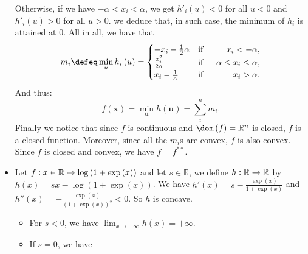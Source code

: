 \documentclass{article}
\begin{document}
\begin{itemize}
           Otherwise, if we have
           $-\alpha < x_{i} < \alpha$,
           we get $h'_{i}\left(u\right) < 0$ 
           for all $u < 0$ and
           $h'_{i}\left(u\right) > 0$ 
           for all $u > 0$.
           we deduce that, in such case,
           the minimum of $h_{i}$
           is attained at $0$.
           All in all, we have that
           \begin{equation*}
               m_{i} \defeq \min_{u} h_{i}\left(u\right)
               = 
               \begin{cases}
                   -x_{i} - \frac{1}{2}\alpha &\text{if } \hfill x_{i} < -\alpha, \\
                   \frac{x_{i}^{2}}{2 \alpha} &\text{if }\hfill -\alpha \leq x_{i} \leq \alpha, \\
                   x_{i} - \frac{1}{\alpha} &\text{if } \hfill x_{i} > \alpha.\\
               \end{cases}
           \end{equation*}
           And thus:
           \begin{equation*}
               f\left(\mathbf{x}\right) = 
               \min_{\mathbf{u}} h\left(\mathbf{u}\right) = 
               \sum_{i}^{n} m_{i}.
           \end{equation*}
           Finally we notice that since
           $f$ is continuous and $\dom\left(f\right) = \mathbb{R}^{n}$
           is closed, $f$ is a closed function.
           Moreover, since
           all the $m_{i}$s are convex,
           $f$ is also convex.
           Since $f$ is closed and
           convex,
           we have $f = f^{**}$.
       \item Let $f \vcentcolon x \in \mathbb{R} \mapsto 
           \log\left(1 + \exp\left(x\right)\right)$ and
           let $s \in \mathbb{R}$,
           we define $h \vcentcolon \mathbb{R} \rightarrow \mathbb{R}$
           by $h\left(x\right) = sx - \log\left(1 + \exp\left(x\right)\right)$.
           We have $h'\left(x\right) = s - \frac{\exp\left(x\right)}{1 + \exp\left(x\right)}$ 
           and $h''\left(x\right) = - \frac{\exp\left(x\right)}{\left(1 + \exp\left(x\right)\right)^{2}}<0$.
           So $h$ is concave.
           \begin{itemize}
               \item For $s < 0$, we have
                   $\lim_{x \rightarrow +\infty} h\left(x\right) = +\infty$.
               \item If $s = 0$, we have

\end{itemize}
\end{itemize}
\end{document}
